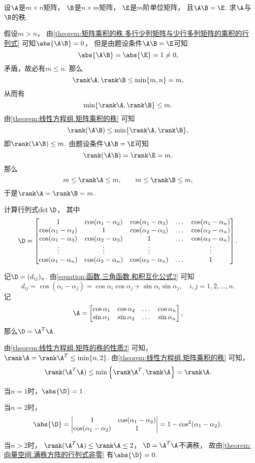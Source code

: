 \begin{example}
设\(\A\)是\(m \times n\)矩阵，
\(\B\)是\(n \times m\)矩阵，
\(\E\)是\(m\)阶单位矩阵，
且\(\A \B = \E\).
求\(\A\)与\(\B\)的秩.
\begin{solution}
假设\(m > n\)，
由\cref{theorem:矩阵乘积的秩.多行少列矩阵与少行多列矩阵的乘积的行列式}
可知\(\abs{\A \B} = 0\)，
但是由题设条件\(\A \B = \E\)可知\[
	\abs{\A \B} = \abs{\E} = 1 \neq 0,
\]
矛盾，故必有\(m \leq n\).
那么\[
	\rank\A,\rank\B \leq \min\{m,n\} = m,
\]
从而有\[
	\min\{\rank\A,\rank\B\} \leq m.
\]
由\cref{theorem:线性方程组.矩阵乘积的秩} 可知\[
	\rank(\A \B) \leq \min\{\rank\A,\rank\B\},
\]
即\(\rank(\A \B) \leq m\).
由题设条件\(\A \B = \E\)可知\[
	\rank(\A \B) = \rank\E = m.
\]
那么\[
	m \leq \rank\A \leq m,
	\qquad
	m \leq \rank\B \leq m,
\]
于是\(\rank\A = \rank\B = m\).
\end{solution}
\end{example}

\begin{example}
计算行列式\(\det\D\)，
其中\[
	\D = \begin{bmatrix}
		1 & \cos(\alpha_1-\alpha_2) & \cos(\alpha_1-\alpha_3) & \dots & \cos(\alpha_1-\alpha_n) \\
		\cos(\alpha_1-\alpha_2) & 1 & \cos(\alpha_2-\alpha_3) & \dots & \cos(\alpha_2-\alpha_n) \\
		\cos(\alpha_1-\alpha_3) & \cos(\alpha_2-\alpha_3) & 1 & \dots & \cos(\alpha_3-\alpha_n) \\
		\vdots & \vdots & \vdots & & \vdots \\
		\cos(\alpha_1-\alpha_n) & \cos(\alpha_2-\alpha_n) & \cos(\alpha_3-\alpha_n) & \dots & 1
	\end{bmatrix}.
\]
\begin{solution}
记\(\D = (d_{ij})_n\).
由\cref{equation:函数.三角函数.和积互化公式2} 可知\[
	d_{ij} = \cos(\alpha_i-\alpha_j)
	= \cos\alpha_i\cos\alpha_j+\sin\alpha_i\sin\alpha_j,
	\quad i,j=1,2,\dotsc,n.
\]
记\[
	\A = \begin{bmatrix}
		\cos\alpha_1 & \cos\alpha_2 & \dots & \cos\alpha_n \\
		\sin\alpha_1 & \sin\alpha_2 & \dots & \sin\alpha_n
	\end{bmatrix},
\]那么\(\D = \A^T \A\).

由\cref{theorem:线性方程组.矩阵的秩的性质2} 可知，
\(\rank\A = \rank\A^T \leq \min\{n,2\}\).
由\cref{theorem:线性方程组.矩阵乘积的秩} 可知，\[
	\rank(\A^T\A) \leq \min\left\{\rank\A^T,\rank\A\right\} = \rank\A.
\]

当\(n=1\)时，\(\abs{\D}=1\).

当\(n=2\)时，\[
	\abs{\D}
	= \begin{vmatrix}
		1 & \cos(\alpha_1-\alpha_2) \\
		\cos(\alpha_1-\alpha_2) & 1
	\end{vmatrix}
	= 1 - \cos^2(\alpha_1-\alpha_2).
\]

当\(n>2\)时，
\(\rank(\A^T\A) \leq \rank\A \leq2\)，
\(\D = \A^T \A\)不满秩，
故由\cref{theorem:向量空间.满秩方阵的行列式非零} 有\(\abs{\D}=0\).
\end{solution}
\end{example}

